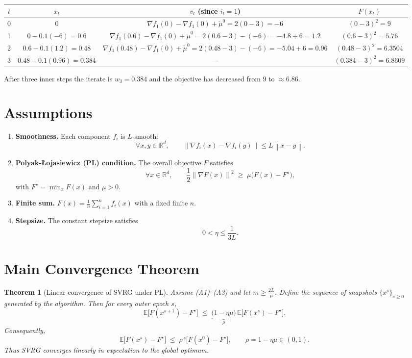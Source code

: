\documentclass{article}
\newtheorem{theorem}{Theorem}
\newcommand{\E}{\mathbb{E}}
\newcommand{\norm}[1]{\left\lVert #1\right\rVert}
\newcommand{\grad}{\nabla}
\newcommand{\R}{\mathbb{R}}
\begin{document}
\begin{center}
\begin{tabular}{c|c|c|c}
$t$ & $x_t$ & $v_t$ (since $i_t=1$) & $F(x_t)$\\ \hline
0 & $0$ &
$\grad f_1(0)-\grad f_1(0)+\widetilde{\mu}^{0}=2(0-3)= -6$ &
$(0-3)^2=9$\\
1 & $0-0.1(-6)=0.6$ &
$\grad f_1(0.6)-\grad f_1(0)+\widetilde{\mu}^{0}
=2(0.6-3)-(-6)=-4.8+6=1.2$ &
$(0.6-3)^2=5.76$\\
2 & $0.6-0.1(1.2)=0.48$ &
$\grad f_1(0.48)-\grad f_1(0)+\widetilde{\mu}^{0}
=2(0.48-3)-(-6)=-5.04+6=0.96$ &
$(0.48-3)^2=6.3504$\\
3 & $0.48-0.1(0.96)=0.384$ &
--- &
$(0.384-3)^2=6.8609$
\end{tabular}
\end{center}
After three inner steps the iterate is $w_3=0.384$ and the objective has
decreased from $9$ to $\approx6.86$.

\newpage
\section*{Assumptions}
\begin{enumerate}[label={A\arabic*}.]
\item \textbf{Smoothness.} Each component $f_i$ is $L$‑smooth:
\[
\forall x,y\in\R^{d},\qquad 
\norm{\grad f_i(x)-\grad f_i(y)}\le L\norm{x-y}.
\tag{A1}
\]

\item \textbf{Polyak‑\L{}ojasiewicz (PL) condition.} The overall objective $F$
satisfies
\[
\forall x\in\R^{d},\qquad 
\frac12\norm{\grad F(x)}^{2}\;\ge\;\mu\bigl(F(x)-F^{\star}\bigr),
\tag{A2}
\]
with $F^{\star}= \min_x F(x)$ and $\mu>0$.

\item \textbf{Finite sum.} $F(x)=\frac1n\sum_{i=1}^{n}f_i(x)$ with a fixed
finite $n$.

\item \textbf{Stepsize.} The constant stepsize satisfies
\[
0<\eta \le \frac{1}{3L}.
\tag{A3}
\]
\end{enumerate}

\section*{Main Convergence Theorem}
\begin{theorem}[Linear convergence of SVRG under PL]
\label{thm:linear}
Assume (A1)–(A3) and let $m\ge \frac{2L}{\mu}$.
Define the sequence of snapshots $\{x^{s}\}_{s\ge0}$ generated by the
algorithm. Then for every outer epoch $s$,
\[
\E\!\bigl[F(x^{s+1})-F^{\star}\bigr]
\;\le\;
\underbrace{\bigl(1-\eta\mu\bigr)}_{\rho}
\,\E\!\bigl[F(x^{s})-F^{\star}\bigr].
\tag{1}
\]
Consequently,
\[
\E\!\bigl[F(x^{s})-F^{\star}\bigr]
\;\le\;
\rho^{\,s}\bigl[F(x^{0})-F^{\star}\bigr],
\qquad
\rho = 1-\eta\mu\in(0,1).
\tag{2}
\]
Thus SVRG converges linearly in expectation to the global optimum.
\end{theorem}
\end{document}
